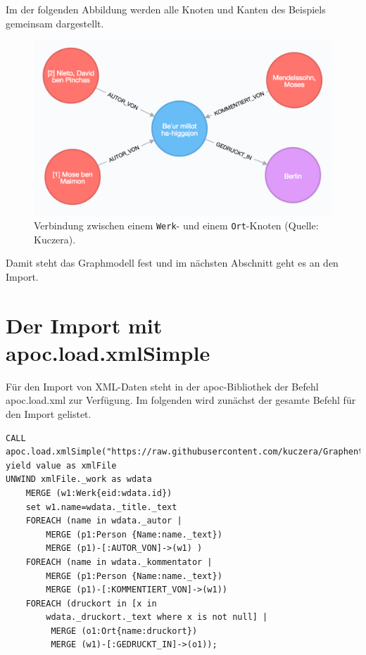 \documentclass[ngerman,]{scrreprt}
\begin{document}
Im der folgenden Abbildung werden alle Knoten und Kanten des Beispiels gemeinsam dargestellt.

\begin{figure}
\centering
\includegraphics{Bilder/Werk-gesamt.png}
\caption{Verbindung zwischen einem \texttt{Werk}- und einem \texttt{Ort}-Knoten (Quelle: Kuczera).}
\end{figure}

Damit steht das Graphmodell fest und im nächsten Abschnitt geht es an den Import.

\section{Der Import mit apoc.load.xmlSimple}\label{der-import-mit-apoc.load.xmlsimple}

Für den Import von XML-Daten steht in der apoc-Bibliothek der Befehl apoc.load.xml zur Verfügung. Im folgenden wird zunächst der gesamte Befehl für den Import gelistet.

\begin{verbatim}
CALL apoc.load.xmlSimple("https://raw.githubusercontent.com/kuczera/Graphentechnologien/master/docs/data/kollatz.xml") yield value as xmlFile
UNWIND xmlFile._work as wdata
    MERGE (w1:Werk{eid:wdata.id})
    set w1.name=wdata._title._text
    FOREACH (name in wdata._autor |
        MERGE (p1:Person {Name:name._text})
        MERGE (p1)-[:AUTOR_VON]->(w1) )
    FOREACH (name in wdata._kommentator |
        MERGE (p1:Person {Name:name._text})
        MERGE (p1)-[:KOMMENTIERT_VON]->(w1))
    FOREACH (druckort in [x in
        wdata._druckort._text where x is not null] |
         MERGE (o1:Ort{name:druckort})
         MERGE (w1)-[:GEDRUCKT_IN]->(o1));
\end{verbatim}
\end{document}
